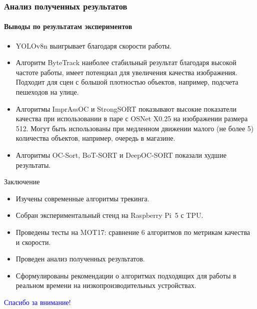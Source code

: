 \documentclass{beamer} %
\begin{document}
\begin{frame}
  \frametitle{Анализ полученных результатов}
  \framesubtitle{Выводы по результатам экспериментов}
  \begin{itemize}
    \item YOLOv8n выигрывает благодаря скорости работы.
    \item Алгоритм ByteTrack наиболее стабильный результат благодаря высокой частоте работы, имеет потенциал для увеличения качества изображения. Подходит для сцен с большой плотностью объектов, например, подсчета пешеходов на улице.
    \item Алгоритмы ImprAssOC и StrongSORT показывают высокие показатели качества при использовании в паре с OSNet X0.25 на изображении размера 512. Могут быть использованы при медленном движении малого (не более 5) количества объектов, например, очередь в магазине.
    \item Алгоритмы OC-Sort, BoT-SORT и DeepOC-SORT показали худшие результаты.
  \end{itemize}
\end{frame}

\begin{frame}{Заключение}
  \begin{itemize}
    \item Изучены современные алгоритмы трекинга.
    \item Собран экспериментальный стенд на Raspberry Pi 5 с TPU.
    \item Проведены тесты на MOT17: сравнение 6 алгоритмов по метрикам качества и скорости.
    \item Проведен анализ полученных результатов.
    \item Сформулированы рекомендации о алгоритмах подходящих для работы в реальном времени на низкопроизводительных устройствах.
  \end{itemize}
\end{frame}


\begin{frame}
  \centering \Huge \textcolor{blue}{Спасибо за внимание!}
\end{frame}
\end{document}
